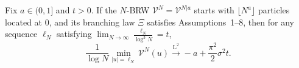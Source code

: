 \begin{theorem}\label{proposition:3.1-slide}
Fix $a\in(0,1]$ and $t>0$. If the $N$-BRW $\mathcal V^N=\mathcal V^{N|a}$ starts with $\lfloor N^a\rfloor$ particles located at $0$, and its branching law $\Xi$ satisfies Assumptions~1--8, then for any sequence $\ell_N$ satisfying $\lim_{N\to\infty}\frac{\ell_N}{\log^3N}=t$,
{
    \begin{equation*}
        \frac 1{\log N}
        \min_{|u|=\ell_N}
        \mathcal V^N(u)
        \xrightarrow{\mathrm L^2}
        -a+\frac{\pi^2}2\sigma^2t.
    \end{equation*}
}
\end{theorem}
